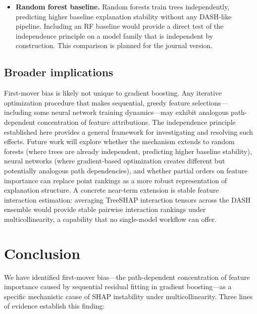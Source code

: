 \documentclass[11pt]{article}
\newcommand{\dash}{\textsc{DASH}}
\begin{document}
\begin{itemize}
    background samples for interventional TreeSHAP. For high-dimensional
    datasets with strong correlation structure, this may be insufficient
    to capture the joint distribution faithfully. A sensitivity analysis
    over $B$ is deferred to the journal version.
  \item \textbf{Random forest baseline.} Random forests train trees
    independently, predicting higher baseline explanation stability
    without any DASH-like pipeline. Including an RF baseline would
    provide a direct test of the independence principle on a model family
    that is independent by construction. This comparison is planned for
    the journal version.
\end{itemize}

\subsection{Broader implications}

First-mover bias is likely not unique to gradient boosting. Any
iterative optimization procedure that makes sequential, greedy feature
selections---including some neural network training dynamics---may exhibit
analogous path-dependent concentration of feature attributions. The
independence principle established here provides a general framework for
investigating and resolving such effects. Future work will explore
whether the mechanism extends to random forests (where trees are
already independent, predicting higher baseline stability), neural
networks (where gradient-based optimization creates different but
potentially analogous path dependencies), and whether partial orders
on feature importance can replace point rankings as a more robust
representation of explanation structure. A concrete near-term extension
is stable feature interaction estimation: averaging TreeSHAP interaction
tensors across the \dash{} ensemble would provide stable pairwise
interaction rankings under multicollinearity, a capability that no
single-model workflow can offer.


\section{Conclusion}
\label{sec:conclusion}

We have identified first-mover bias---the path-dependent concentration of
feature importance caused by sequential residual fitting in gradient
boosting---as a specific mechanistic cause of SHAP instability under
multicollinearity. Three lines of evidence establish this finding:
\end{document}
